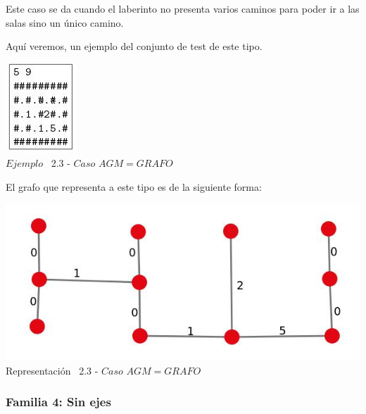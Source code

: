 Este caso se da cuando el laberinto no presenta varios caminos para poder ir a las salas sino un \'unico camino.

Aqu\'i veremos, un ejemplo del conjunto de test de este tipo.\\
 
\vspace*{0.3cm} \vspace*{0.3cm}
  \begin{center}
 \includegraphics[scale=1.6]{./EJ2/ej2completo.jpeg}
\\ {$Ejemplo$ \ 2.3 - $Caso$ $AGM = GRAFO$}
  \end{center}
  \vspace*{0.3cm}

El grafo que representa a este tipo es de la siguiente forma:\\

\vspace*{0.3cm} \vspace*{0.3cm}
  \begin{center}
 \includegraphics[scale=0.5]{./EJ2/ej2grafocompleto.jpeg}
 \\{Representación \ 2.3 - $Caso$ $AGM = GRAFO$}
  \end{center}
  \vspace*{0.3cm}

\begin{center}
 \subsubsection*{Familia 4: Sin ejes}
\end{center}


